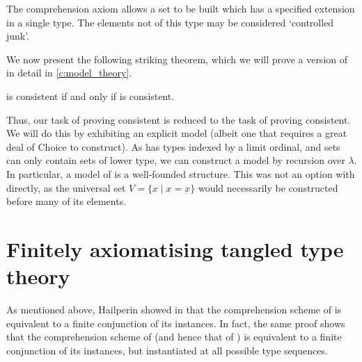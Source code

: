 The comprehension axiom allows a set to be built which has a specified extension in a single type.
The elements not of this type may be considered `controlled junk'.

We now present the following striking theorem, which we will prove a version of in detail in \cref{c:model_theory}.

\begin{theorem*}[Holmes]
  {\NF} is consistent if and only if {\TTT} is consistent. \cite{holmes-ttt}
\end{theorem*}

Thus, our task of proving {\NF} consistent is reduced to the task of proving {\TTT} consistent.
We will do this by exhibiting an explicit model (albeit one that requires a great deal of Choice to construct).
As {\TTT} has types indexed by a limit ordinal, and sets can only contain sets of lower type, we can construct a model by recursion over \( \lambda \).
In particular, a model of {\TTT} is a well-founded structure.
This was not an option with {\NF} directly, as the universal set \( V = \{ x \mid x = x \} \) would necessarily be constructed before many of its elements.

\section{Finitely axiomatising tangled type theory}

As mentioned above, Hailperin showed in \cite{hailperin-finite-axiomatisation} that the comprehension scheme of {\NF} is equivalent to a finite conjunction of its instances.
In fact, the same proof shows that the comprehension scheme of {\TST} (and hence that of {\TTT}) is equivalent to a finite conjunction of its instances, but instantiated at all possible type sequences.

